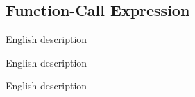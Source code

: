
\subsection{Function-Call Expression}
{
	\lipsum[1]
	
	\begin{itemize}
	{
		\item[\texttt{code}] English description
		
		\item[\texttt{code}] English description
		
		\item[\texttt{code}] English description
	}
	\end{itemize}
}
